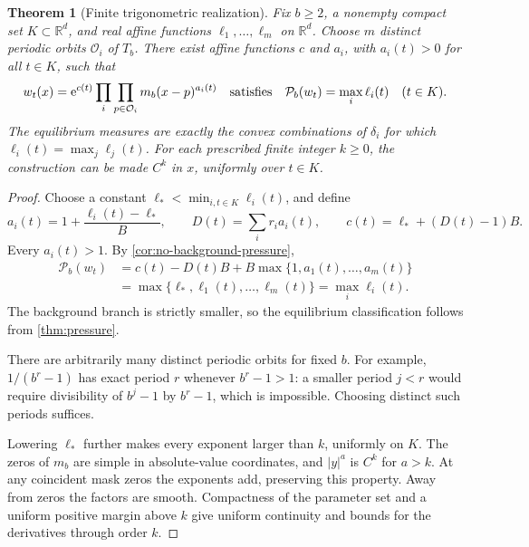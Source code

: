 \documentclass[11pt,a4paper]{article}
\numberwithin{equation}{section}
\newtheorem{theorem}{Theorem}[section]
\theoremstyle{definition}
\theoremstyle{remark}
\newcommand{\RR}{\mathbb R}
\newcommand{\ee}{\mathrm e}
\newcommand{\cO}{\mathcal O}
\newcommand{\PP}{\mathcal P}
\begin{document}
\begin{theorem}[Finite trigonometric realization]
\label{thm:realization}
Fix $b\ge2$, a nonempty compact set $K\subset\RR^d$, and real affine
functions $\ell_1,\ldots,\ell_m$ on $\RR^d$. Choose $m$ distinct
periodic orbits $\cO_i$ of $T_b$. There exist affine functions $c$ and
$a_i$, with $a_i(t)>0$ for all $t\in K$, such that
\begin{equation}
 w_t(x)=\ee^{c(t)}\prod_i\prod_{p\in\cO_i}m_b(x-p)^{a_i(t)}
 \quad\hbox{satisfies}\quad
 \PP_b(w_t)=\max_i\ell_i(t)\quad(t\in K).
 \label{eq:realization}
\end{equation}
The equilibrium measures are exactly the convex combinations of
$\delta_i$ for which $\ell_i(t)=\max_j\ell_j(t)$.
For each prescribed finite integer $k\ge0$, the construction can be
made $C^k$ in $x$, uniformly over $t\in K$.
\end{theorem}
\begin{proof}
Choose a constant $\ell_*<\min_{i,t\in K}\ell_i(t)$, and define
\begin{equation}
 a_i(t)=1+\frac{\ell_i(t)-\ell_*}{B},\qquad
 D(t)=\sum_i r_i a_i(t),\qquad
 c(t)=\ell_*+(D(t)-1)B.
 \label{eq:realization-construction}
\end{equation}
Every $a_i(t)>1$. By \cref{cor:no-background-pressure},
\begin{align*}
 \PP_b(w_t)
 &=c(t)-D(t)B+B\max\{1,a_1(t),\ldots,a_m(t)\}\\
 &=\max\{\ell_*,\ell_1(t),\ldots,\ell_m(t)\}
  =\max_i\ell_i(t).
\end{align*}
The background branch is strictly smaller, so the equilibrium
classification follows from \cref{thm:pressure}.

There are arbitrarily many distinct periodic orbits for fixed $b$.
For example, $1/(b^r-1)$ has exact period $r$ whenever $b^r-1>1$:
a smaller period $j<r$ would require divisibility of $b^j-1$ by
$b^r-1$, which is impossible. Choosing distinct such periods suffices.

Lowering $\ell_*$ further makes every exponent larger than $k$,
uniformly on $K$. The zeros of $m_b$ are simple in absolute-value
coordinates, and $|y|^a$ is $C^k$ for $a>k$. At any coincident mask
zeros the exponents add, preserving this property. Away from zeros
the factors are smooth. Compactness of the parameter set and a
uniform positive margin above $k$ give uniform continuity and bounds
for the derivatives through order $k$.
\end{proof}
\end{document}
